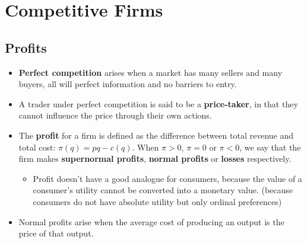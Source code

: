 \documentclass[a4paper]{article}
\begin{document}
\section{Competitive Firms}
\subsection{Profits}
\begin{itemize}
    \item \textbf{Perfect competition} arises when a market has many sellers and many buyers, all will perfect information and no barriers to entry.
    \item A trader under perfect competition is said to be a \textbf{price-taker}, in that they cannot influence the price through their own actions.
    \item The \textbf{profit} for a firm is defined as the difference between total revenue and total cost: $\pi(q) = pq - c(q)$. When $\pi > 0$, $\pi = 0$ or $\pi < 0$, we say that the firm makes \textbf{supernormal profits}, \textbf{normal profits} or \textbf{losses} respectively.
    \begin{itemize}
        \item Profit doesn't have a good analogue for consumers, because the value of a consumer's utility cannot be converted into a monetary value. (because consumers do not have absolute utility but only ordinal preferences)
    \end{itemize}
    \item Normal profits arise when the average cost of producing an output is the price of that output.
\end{itemize}
\end{document}
